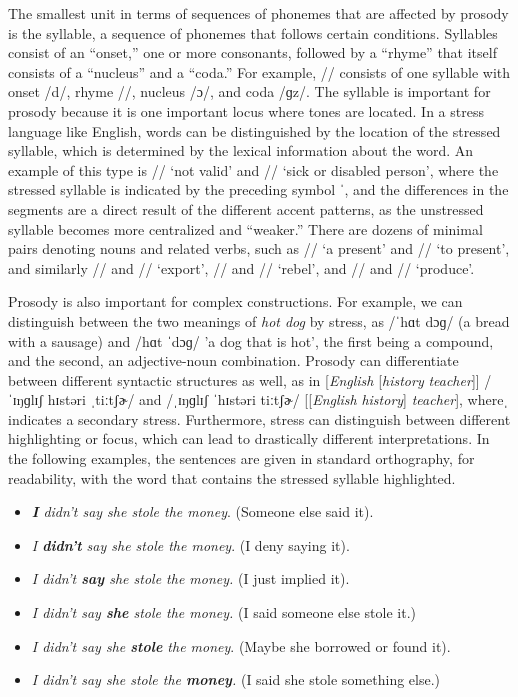 The smallest unit in terms of sequences of phonemes that are affected by prosody is the syllable, a sequence of phonemes that follows certain conditions. Syllables consist of an ``onset,'' one or more consonants, followed by a ``rhyme'' that itself consists of a ``nucleus'' and a ``coda.'' For example, // consists of one syllable with onset /d/, rhyme //, nucleus /ɔ/, and coda /ɡz/. The syllable is important for prosody because it is one important locus where tones are located. In a stress language like English, words can be distinguished by the location of the stressed syllable, which is determined by the lexical information about the word. An example of this type is // `not valid' and // `sick or disabled person', where the stressed syllable is indicated by the preceding symbol ˈ, and the differences in the segments are a direct result of the different accent patterns, as the unstressed syllable becomes more centralized and ``weaker.'' There are dozens of minimal pairs denoting nouns and related verbs, such as // `a present' and // `to present', and similarly // and // `export', // and // `rebel', and // and // `produce'.

Prosody is also important for complex constructions. For example, we can distinguish between the two meanings of \textit{hot dog} by stress, as /ˈhɑt dɔɡ/ (a bread with a sausage) and /hɑt ˈdɔɡ/ 'a dog that is hot', the first being a compound, and the second, an adjective-noun combination. Prosody can differentiate between different syntactic structures as well, as in [\textit{English} [\textit{history} \textit{teacher}]] /ˈɪŋɡlɪʃ hɪstəri ˌtiːtʃɚ/ and /ˌɪŋɡlɪʃ ˈhɪstəri tiːtʃɚ/ [[\textit{English} \textit{history}] \textit{teacher}], whereˌ indicates a secondary stress. Furthermore, stress can distinguish between different highlighting or focus, which can lead to drastically different interpretations. In the following examples, the sentences are given in standard orthography, for readability, with the word that contains the stressed syllable highlighted.

\begin{itemize}
    \item \textit{\textbf{I} didn't say she stole the money}. (Someone else said it).
    \item \textit{I \textbf{didn't }say she stole the money}. (I deny saying it).
    \item \textit{I didn't \textbf{say} she stole the money.}	(I just implied it).
    \item \textit{I didn't say \textbf{she} stole the money.} (I said someone else stole it.)
    \item \textit{I didn't say she \textbf{stole} the money}. (Maybe she borrowed or found it).
    \item \textit{I didn't say she stole the \textbf{money}.} (I said she stole something else.)
\end{itemize}

